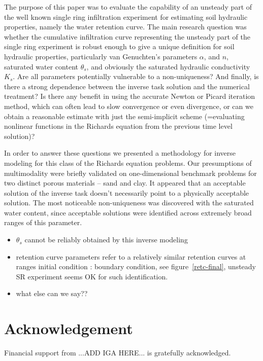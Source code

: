 \documentclass[review,times,3p,twocolumn,10pt]{elsarticle}
\begin{document}
The purpose of this paper was to evaluate the capability of an unsteady part of the well known single ring infiltration experiment for estimating  soil hydraulic properties, namely the water retention curve. The main research question was whether the cumulative infiltration curve representing the unsteady part of the single ring experiment is robust enough to give a unique definition for soil hydraulic properties, particularly van Genuchten's parameters $\alpha$, and $n$, saturated water content $\theta_s$, and obviously the saturated hydraulic conductivity $K_s$. 
  Are all parameters potentially vulnerable to a non-uniqueness? And finally, is there a strong dependence between the inverse task solution and the numerical treatment? Is there any benefit in using the accurate Newton or Picard iteration method, which can often lead to slow convergence or even divergence, or can we obtain a reasonable estimate with just the semi-implicit scheme (=evaluating  nonlinear functions in the Richards equation from the previous time level solution)?
  
In order to answer these questions we presented a methodology for inverse modeling for this class of the Richards equation problems. Our  presumptions of multimodality were briefly validated on one-dimensional benchmark problems for two distinct porous materials -- sand and clay. It appeared that an acceptable solution of the inverse task   doesn't necessarily point to a physically acceptable solution. The most noticeable non-uniqueness was discovered with the saturated water content, since  acceptable solutions were identified across  extremely broad ranges  of this parameter.
  
\begin{itemize}
\item $\theta_s$ cannot be reliably obtained by this inverse modeling 
\item retention curve parameters refer to a relatively similar retention curves at ranges initial condition : boundary condition, see figure~\ref{retc-final}, unsteady SR experiment seems OK for such identification.
\item  what else can we say??
\end{itemize}



\section{Acknowledgement}

Financial support from ...ADD IGA HERE... is gratefully acknowledged.
\end{document}
